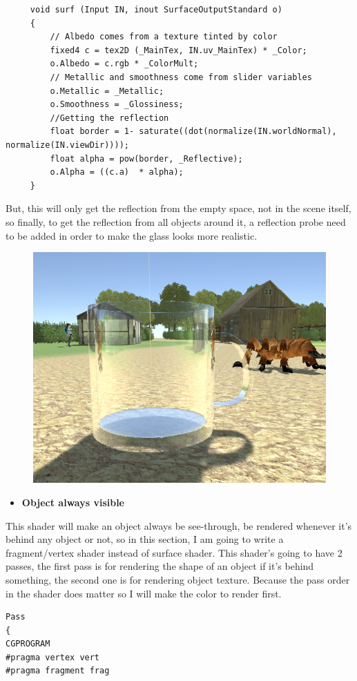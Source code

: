 \documentclass[a4paper, 13pt]{extarticle}
\begin{document}
{\begin{figure}[h]
  	\end{figure}
     \begin{lstlisting}
     void surf (Input IN, inout SurfaceOutputStandard o)
     {
	     // Albedo comes from a texture tinted by color
	     fixed4 c = tex2D (_MainTex, IN.uv_MainTex) * _Color;
	     o.Albedo = c.rgb * _ColorMult;
	     // Metallic and smoothness come from slider variables
	     o.Metallic = _Metallic;
	     o.Smoothness = _Glossiness;
	     //Getting the reflection
	     float border = 1- saturate((dot(normalize(IN.worldNormal), normalize(IN.viewDir))));
	     float alpha = pow(border, _Reflective);
	     o.Alpha = ((c.a)  * alpha);
     }
      \end{lstlisting}
      But, this will only get the reflection from the empty space, not in the scene itself, so finally, to get the reflection from all objects around it, a reflection probe need to be added in order to make the glass looks more realistic.
      \begin{figure}[h]
      	\begin{minipage}{1\textwidth}
      		\centering
      		\includegraphics[width=0.4\linewidth]{intructions/reflection_probe.png}
      		\centering
      		\label{fig:test32}
      	\end{minipage}      	
      \end{figure}
  \begin{itemize}
 	\item \bfseries Object always visible 
  \end{itemize}
This shader will make an object always be see-through, be rendered whenever it's behind any object or not, so in this section, I am going to write a fragment/vertex shader instead of surface shader. This shader's going to have 2 passes, the first pass is for rendering the shape of an object if it's behind something, the second one is for rendering object texture. Because the pass order in the shader does matter so I will make the color to render first. 

\begin{lstlisting}
Pass
{
CGPROGRAM
#pragma vertex vert
#pragma fragment frag


\end{lstlisting}}
\end{document}

